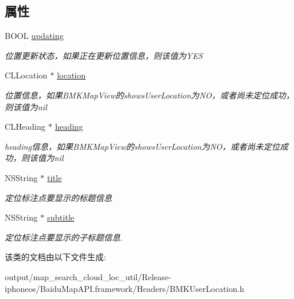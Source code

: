 \subsection*{属性}
\begin{DoxyCompactItemize}
\item 
\hypertarget{interface_b_m_k_user_location_a57e486ccb3b7665183e9e1eaa4d2716e}{}B\+O\+O\+L \hyperlink{interface_b_m_k_user_location_a57e486ccb3b7665183e9e1eaa4d2716e}{updating}\label{interface_b_m_k_user_location_a57e486ccb3b7665183e9e1eaa4d2716e}

\begin{DoxyCompactList}\small\item\em 位置更新状态，如果正在更新位置信息，则该值为\+Y\+E\+S \end{DoxyCompactList}\item 
\hypertarget{interface_b_m_k_user_location_aba4b76e55f4605c5554fe16aca1b4fbf}{}C\+L\+Location $\ast$ \hyperlink{interface_b_m_k_user_location_aba4b76e55f4605c5554fe16aca1b4fbf}{location}\label{interface_b_m_k_user_location_aba4b76e55f4605c5554fe16aca1b4fbf}

\begin{DoxyCompactList}\small\item\em 位置信息，如果\+B\+M\+K\+Map\+View的shows\+User\+Location为\+N\+O，或者尚未定位成功，则该值为nil \end{DoxyCompactList}\item 
\hypertarget{interface_b_m_k_user_location_a23e9a1be042844a326e4bbc589ec613c}{}C\+L\+Heading $\ast$ \hyperlink{interface_b_m_k_user_location_a23e9a1be042844a326e4bbc589ec613c}{heading}\label{interface_b_m_k_user_location_a23e9a1be042844a326e4bbc589ec613c}

\begin{DoxyCompactList}\small\item\em heading信息，如果\+B\+M\+K\+Map\+View的shows\+User\+Location为\+N\+O，或者尚未定位成功，则该值为nil \end{DoxyCompactList}\item 
\hypertarget{interface_b_m_k_user_location_a8fc42845ec226a1af2de73c8dd4d183d}{}N\+S\+String $\ast$ \hyperlink{interface_b_m_k_user_location_a8fc42845ec226a1af2de73c8dd4d183d}{title}\label{interface_b_m_k_user_location_a8fc42845ec226a1af2de73c8dd4d183d}

\begin{DoxyCompactList}\small\item\em 定位标注点要显示的标题信息 \end{DoxyCompactList}\item 
\hypertarget{interface_b_m_k_user_location_af38d7aa4f89637da255ca7308fcaa240}{}N\+S\+String $\ast$ \hyperlink{interface_b_m_k_user_location_af38d7aa4f89637da255ca7308fcaa240}{subtitle}\label{interface_b_m_k_user_location_af38d7aa4f89637da255ca7308fcaa240}

\begin{DoxyCompactList}\small\item\em 定位标注点要显示的子标题信息. \end{DoxyCompactList}\end{DoxyCompactItemize}


该类的文档由以下文件生成\+:\begin{DoxyCompactItemize}
\item 
output/map\+\_\+search\+\_\+cloud\+\_\+loc\+\_\+util/\+Release-\/iphoneos/\+Baidu\+Map\+A\+P\+I.\+framework/\+Headers/B\+M\+K\+User\+Location.\+h\end{DoxyCompactItemize}
